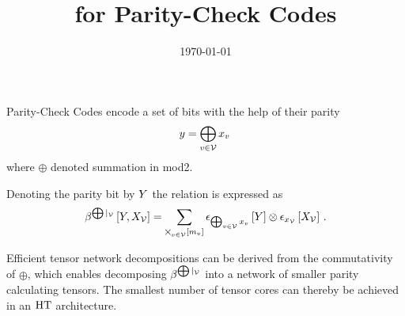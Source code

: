 \documentclass[aps,onecolumn,nofootinbib,pra]{article}
\begin{document}
    \title{\tnreason{} for Parity-Check Codes}

    \maketitle
    \date{\today}

    Parity-Check Codes encode a set of bits with the help of their parity
    \begin{align*}
        y = \bigoplus_{v\in\mathcal{V}} x_{v} \,
    \end{align*}
    where $\oplus$ denoted summation in mod2.

    Denoting the parity bit by $Y$ the relation is expressed as
    \begin{align*}
        \beta^{\bigoplus|_{\mathcal{V}}}\left[Y,X_{\mathcal{V}}\right]
        = \sum_{\bigtimes_{v\in\mathcal{V}}[m_{v}]} \epsilon_{\bigoplus_{v\in\mathcal{V}} x_{v}}\left[Y\right]
        \otimes \epsilon_{x_{\mathcal{V}}}\left[X_{\mathcal{V}}\right] \, .
    \end{align*}

    Efficient tensor network decompositions can be derived from the commutativity of $\oplus$, which enables decomposing $\beta^{\bigoplus|_{\mathcal{V}}}$ into a network of smaller parity calculating tensors.
    The smallest number of tensor cores can thereby be achieved in an $\mathrm{HT}$ architecture.
\end{document}
